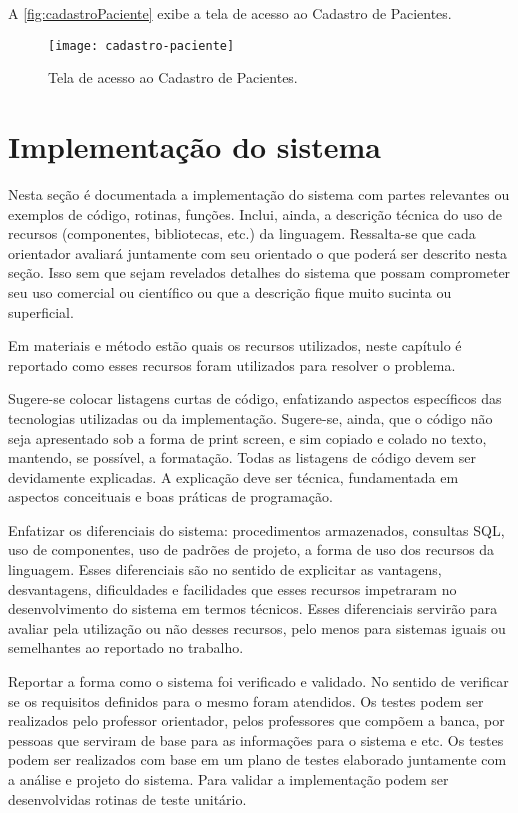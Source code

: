 A \autoref{fig:cadastroPaciente} exibe a tela de acesso ao Cadastro de Pacientes.

\begin{figure}[htpb]%
\caption{Tela de acesso ao Cadastro de Pacientes.}%
\label{fig:cadastroPaciente}%
\texttt{[image: cadastro-paciente]}%
\fonte{}%
\end{figure}

\section{Implementação do sistema}\label{sec:implementacaoSistema}

Nesta seção é documentada a implementação do sistema com partes relevantes ou exemplos de código, rotinas, funções. Inclui, ainda, a descrição técnica do uso de recursos (componentes, bibliotecas, etc.) da linguagem. Ressalta-se que cada orientador avaliará juntamente com seu orientado o que poderá ser descrito nesta seção. Isso sem que sejam revelados detalhes do sistema que possam comprometer seu uso comercial ou científico ou que a descrição fique muito sucinta ou superficial.

Em materiais e método estão quais os recursos utilizados, neste capítulo é reportado como esses recursos foram utilizados para resolver o problema.

Sugere-se colocar listagens curtas de código, enfatizando aspectos específicos das tecnologias utilizadas ou da implementação. Sugere-se, ainda, que o código não seja apresentado sob a forma de print screen, e sim copiado e colado no texto, mantendo, se possível, a formatação. Todas as listagens de código devem ser devidamente explicadas. A explicação deve ser técnica, fundamentada em aspectos conceituais e boas práticas de programação.

Enfatizar os diferenciais do sistema: procedimentos armazenados, consultas SQL, uso de componentes, uso de padrões de projeto, a forma de uso dos recursos da linguagem. Esses diferenciais são no sentido de explicitar as vantagens, desvantagens, dificuldades e facilidades que esses recursos impetraram no desenvolvimento do sistema em termos técnicos. Esses diferenciais servirão para avaliar pela utilização ou não desses recursos, pelo menos para sistemas iguais ou semelhantes ao reportado no trabalho.

Reportar a forma como o sistema foi verificado e validado. No sentido de verificar se os requisitos definidos para o mesmo foram atendidos. Os testes podem ser realizados pelo professor orientador, pelos professores que compõem a banca, por pessoas que serviram de base para as informações para o sistema e etc. Os testes podem ser realizados com base em um plano de testes elaborado juntamente com a análise e projeto do sistema. Para validar a implementação podem ser desenvolvidas rotinas de teste unitário.

